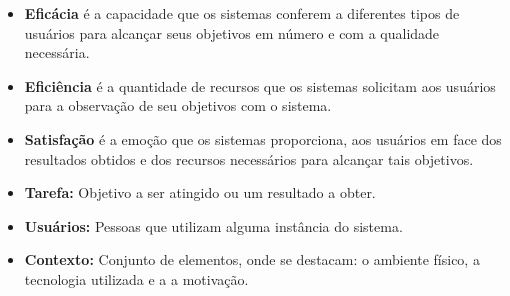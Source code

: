 \begin{itemize}
\item \textbf{Eficácia} é a capacidade que os sistemas conferem a diferentes tipos de usuários para alcançar seus objetivos em número e com a qualidade necessária. 

\item \textbf{Eficiência} é a quantidade de recursos que os sistemas solicitam aos usuários para a observação de seu objetivos com o sistema.

\item \textbf{Satisfação} é a emoção que os sistemas proporciona, aos usuários em face dos resultados obtidos e dos recursos necessários para alcançar tais objetivos. 

\item \textbf{Tarefa:} Objetivo a ser atingido ou um resultado a obter.

\item \textbf{Usuários:} Pessoas que utilizam alguma instância do sistema.

\item \textbf{Contexto:} Conjunto de elementos, onde se destacam: o ambiente físico, a tecnologia utilizada e a a motivação.
\end{itemize}

